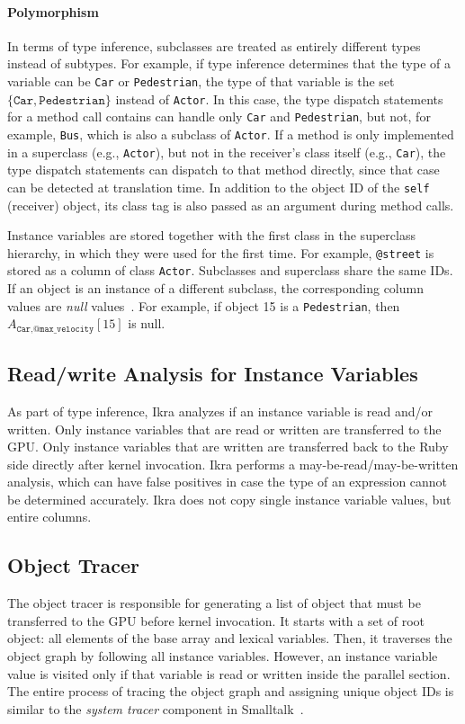 \documentclass[preprint]{sigplanconf}
\begin{document}
\paragraph{Polymorphism}
In terms of type inference, subclasses are treated as entirely different types instead of subtypes. For example, if type inference determines that the type of a variable can be \texttt{Car} or \texttt{Pedestrian}, the type of that variable is the set $\{\texttt{Car}, \texttt{Pedestrian}\}$ instead of \texttt{Actor}. In this case, the type dispatch statements for a method call contains can handle only \texttt{Car} and \texttt{Pedestrian}, but not, for example, \texttt{Bus}, which is also a subclass of \texttt{Actor}. If a method is only implemented in a superclass (e.g., \texttt{Actor}), but not in the receiver's class itself (e.g., \texttt{Car}), the type dispatch statements can dispatch to that method directly, since that case can be detected at translation time. In addition to the object ID of the \texttt{self} (receiver) object, its class tag is also passed as an argument during method calls.

Instance variables are stored together with the first class in the superclass hierarchy, in which they were used for the first time. For example, \texttt{@street} is stored as a column of class \texttt{Actor}. Subclasses and superclass share the same IDs. If an object is an instance of a different subclass, the corresponding column values are \emph{null} values~\cite{Mattis:2015:COI:2814228.2814230}. For example, if object 15 is a \texttt{Pedestrian}, then $A_{\texttt{Car}, \texttt{@max\_velocity}}[15]$ is null.

\subsection{Read/write Analysis for Instance Variables}
\label{sec:impl_copyback}
As part of type inference, Ikra analyzes if an instance variable is read and/or written. Only instance variables that are read or written are transferred to the GPU. Only instance variables that are written are transferred back to the Ruby side directly after kernel invocation. Ikra performs a may-be-read/may-be-written analysis, which can have false positives in case the type of an expression cannot be determined accurately. Ikra does not copy single instance variable values, but entire columns.

\subsection{Object Tracer}
\label{sec:impl_tracer}
The object tracer is responsible for generating a list of object that must be transferred to the GPU before kernel invocation. It starts with a set of root object: all elements of the base array and lexical variables. Then, it traverses the object graph by following all instance variables. However, an instance variable value is visited only if that variable is read or written inside the parallel section. The entire process of tracing the object graph and assigning unique object IDs is similar to the \emph{system tracer} component in Smalltalk~\cite{Krasner:1983:SBH:226}.
\end{document}
